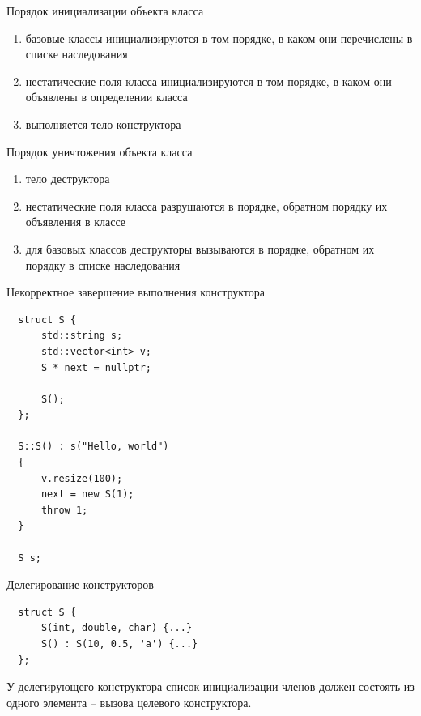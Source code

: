 \documentclass[unknownkeysallowed,xcolor=table]{beamer}
\begin{document}
\begin{frame}{Порядок инициализации объекта класса}
  \begin{enumerate}
    \item базовые классы инициализируются в том порядке, в каком они перечислены в списке наследования \vspace{1em}
    \item нестатические поля класса инициализируются в том порядке, в каком они объявлены в определении класса \vspace{1em}
    \item выполняется тело конструктора
  \end{enumerate}
\end{frame}

\begin{frame}{Порядок уничтожения объекта класса}
  \begin{enumerate}
    \item тело деструктора \vspace{1em}
    \item нестатические поля класса разрушаются в порядке, обратном порядку их объявления в классе \vspace{1em}
    \item для базовых классов деструкторы вызываются в порядке, обратном их порядку в списке наследования
  \end{enumerate}
\end{frame}

\begin{frame}[fragile]{Некорректное завершение выполнения конструктора}
  \begin{lstlisting}
  struct S {
      std::string s;
      std::vector<int> v;
      S * next = nullptr;

      S();
  };

  S::S() : s("Hello, world")
  {
      v.resize(100);
      next = new S(1);
      throw 1;
  }

  S s;
  \end{lstlisting}
\end{frame}

\begin{frame}[fragile]{Делегирование конструкторов}
  \begin{lstlisting}
  struct S {
      S(int, double, char) {...}
      S() : S(10, 0.5, 'a') {...}
  };
  \end{lstlisting}

  \vspace{2em}

  У делегирующего конструктора список инициализации членов должен состоять из одного элемента -- вызова целевого конструктора.
\end{frame}
\end{document}
